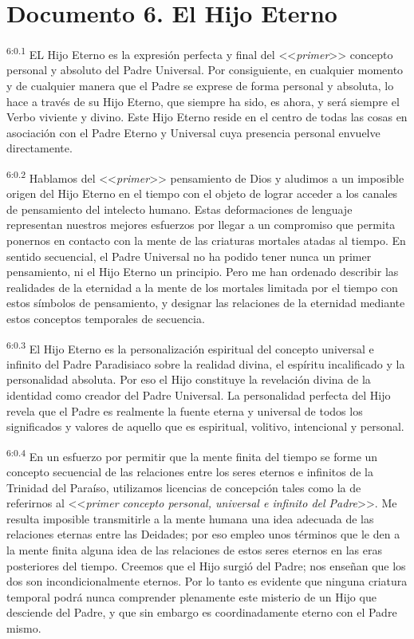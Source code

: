 \chapter{Documento 6. El Hijo Eterno}
\par
\textsuperscript{6:0.1} EL Hijo Eterno es la expresión perfecta y final del <<\textit{primer}>> concepto personal y absoluto del Padre Universal. Por consiguiente, en cualquier momento y de cualquier manera que el Padre se exprese de forma personal y absoluta, lo hace a través de su Hijo Eterno, que siempre ha sido, es ahora, y será siempre el Verbo viviente y divino. Este Hijo Eterno reside en el centro de todas las cosas en asociación con el Padre Eterno y Universal cuya presencia personal envuelve directamente.

\par
\textsuperscript{6:0.2} Hablamos del <<\textit{primer}>> pensamiento de Dios y aludimos a un imposible origen del Hijo Eterno en el tiempo con el objeto de lograr acceder a los canales de pensamiento del intelecto humano. Estas deformaciones de lenguaje representan nuestros mejores esfuerzos por llegar a un compromiso que permita ponernos en contacto con la mente de las criaturas mortales atadas al tiempo. En sentido secuencial, el Padre Universal no ha podido tener nunca un primer pensamiento, ni el Hijo Eterno un principio. Pero me han ordenado describir las realidades de la eternidad a la mente de los mortales limitada por el tiempo con estos símbolos de pensamiento, y designar las relaciones de la eternidad mediante estos conceptos temporales de secuencia.

\par
\textsuperscript{6:0.3} El Hijo Eterno es la personalización espiritual del concepto universal e infinito del Padre Paradisiaco sobre la realidad divina, el espíritu incalificado y la personalidad absoluta. Por eso el Hijo constituye la revelación divina de la identidad como creador del Padre Universal. La personalidad perfecta del Hijo revela que el Padre es realmente la fuente eterna y universal de todos los significados y valores de aquello que es espiritual, volitivo, intencional y personal.

\par
\textsuperscript{6:0.4} En un esfuerzo por permitir que la mente finita del tiempo se forme un concepto secuencial de las relaciones entre los seres eternos e infinitos de la Trinidad del Paraíso, utilizamos licencias de concepción tales como la de referirnos al <<\textit{primer concepto personal, universal e infinito del Padre}>>. Me resulta imposible transmitirle a la mente humana una idea adecuada de las relaciones eternas entre las Deidades; por eso empleo unos términos que le den a la mente finita alguna idea de las relaciones de estos seres eternos en las eras posteriores del tiempo. Creemos que el Hijo surgió del Padre; nos enseñan que los dos son incondicionalmente eternos. Por lo tanto es evidente que ninguna criatura temporal podrá nunca comprender plenamente este misterio de un Hijo que desciende del Padre, y que sin embargo es coordinadamente eterno con el Padre mismo.


